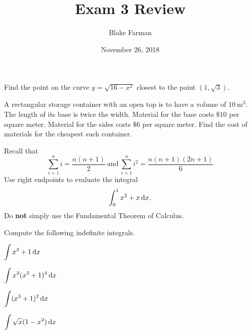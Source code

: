 \documentclass[10pt]{amsart}
\title{Exam 3 Review}
\date{November 26, 2018}
\author{Blake Farman}
\begin{document}
\maketitle

\makenameslot

\begin{thm}
  Find the point on the curve \(y = \sqrt{16 - x^2}\) closest to the point \((1, \sqrt{3})\).
\end{thm}

\vspace{2in}

\begin{thm}
  A rectangular storage container with an open top is to have a volume of \(10\ \mathrm{m}^3\).
  The length of its base is twice the width.
  Material for the base costs \(\$10\) per square meter.
  Material for the sides costs \(\$6\) per square meter.
  Find the cost of materials for the cheapest such container.
\end{thm}

\newpage

\begin{thm}
  Recall that
  \[\sum_{i=1}^n i = \frac{n(n+1)}{2}\ \text{and}\ \sum_{i = 1}^n i^2 = \frac{n(n+1)(2n+1)}{6}\]
  Use right endpoints to evaluate the integral
  \[\int_0^1 x^2 + x \dif x.\]
  Do \textbf{not} simply use the Fundamental Theorem of Calculus.
\end{thm}

\newpage

Compute the following indefinite integrals.
\begin{multicols}{2}
  \begin{thm}
    \(\displaystyle{\int x^3 + 1 \dif x}\)
  \end{thm}

  \begin{thm}
    \(\displaystyle{\int x^2(x^3 + 1)^4\dif x}\)
  \end{thm}
\end{multicols}

\vspace{2in}

\begin{multicols}{2}
  \begin{thm}
    \(\displaystyle{\int(x^3 + 1)^2 \dif x}\)
  \end{thm}
  
  \begin{thm}
    \(\displaystyle{\int \sqrt{x}(1 - x^2)\dif x}\)
  \end{thm}
\end{multicols}
\end{document}
